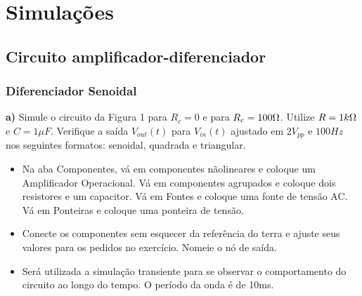 \section{Simulações}

\subsection{Circuito amplificador-diferenciador}

\subsubsection{Diferenciador Senoidal}

\textbf{a)} Simule o circuito da Figura 1 para $R_c=0$ e para $R_c=100\ohm$. Utilize $R = 1k\ohm$ e $C = 1\mu F$. Verifique a saída $V_{out}(t)$ para $V_{in}(t)$ ajustado em $2V_{pp}$ e $100 Hz$ nos seguintes formatos: senoidal, quadrada e triangular.

\begin{itemize}
    \item Na aba Componentes, vá em componentes nãolineares e coloque um Amplificador Operacional. Vá em componentes agrupados e coloque dois resistores e um capacitor. Vá em Fontes e coloque uma fonte de tensão AC. Vá em Ponteiras e coloque uma ponteira de tensão.
\end{itemize}

\begin{figure}[H]
\end{figure}


\begin{itemize}
    \item Conecte os componentes sem esquecer da referência do terra e ajuste seus valores para os pedidos no exercício. Nomeie o nó de saída.
\end{itemize}

    
\begin{itemize}
    \item Será utilizada a simulação transiente para se observar o comportamento do circuito ao longo do tempo. O período da onda é de 10ms.
\end{itemize}

